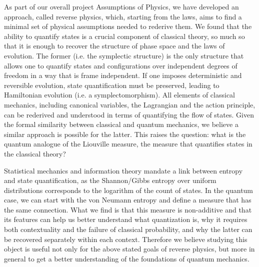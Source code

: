 \documentclass[10pt,twocolumn, nofootinbib]{revtex4-2}
\begin{document}
As part of our overall project Assumptions of Physics,\cite{aop-book} we have developed an approach, called reverse physics,\cite{aop-phys-ReversePhysics} which, starting from the laws, aims to find a minimal set of physical assumptions needed to rederive them. We found that the ability to quantify states is a crucial component of classical theory, so much so that it is enough to recover the structure of phase space and the laws of evolution.\cite{aop-phil-HamiltonianPrivilege,aop-phil-Hamiltonianinformation} The former (i.e. the symplectic structure) is the only structure that allows one to quantify states and configurations over independent degrees of freedom in a way that is frame independent. If one imposes deterministic and reversible evolution, state quantification must be preserved, leading to Hamiltonian evolution (i.e. a symplectomorphism). All elements of classical mechanics, including canonical variables, the Lagrangian and the action principle, \cite{aop-phys-ActionPrincipleInterpretation} can be rederived and understood in terms of quantifying the flow of states. Given the formal similarity between classical and quantum mechanics, we believe a similar approach is possible for the latter. This raises the question: what is the quantum analogue of the Liouville measure, the measure that quantifies states in the classical theory?

Statistical mechanics and information theory mandate a link between entropy and state quantification, as the Shannon/Gibbs entropy over uniform distributions corresponds to the logarithm of the count of states. In the quantum case, we can start with the von Neumann entropy and define a measure that has the same connection. What we find is that this measure is non-additive and that its features can help us better understand what quantization is, why it requires both contextuality and the failure of classical probability, and why the latter can be recovered separately within each context. Therefore we believe studying this object is useful not only for the above stated goals of reverse physics, but more in general to get a better understanding of the foundations of quantum mechanics.
\end{document}
